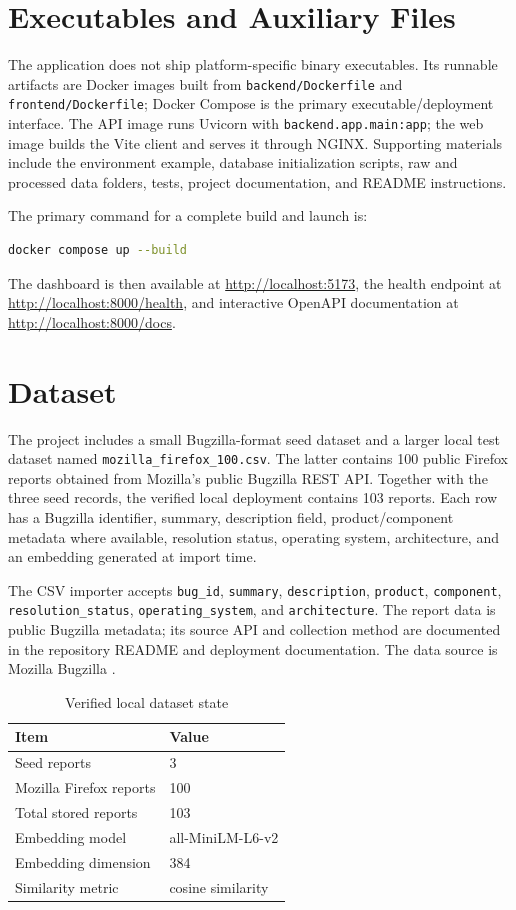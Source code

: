 \documentclass[conference]{IEEEtran}
\begin{document}
\section{Executables and Auxiliary Files}
The application does not ship platform-specific binary executables. Its runnable artifacts are Docker images built from \texttt{backend/Dockerfile} and \texttt{frontend/Dockerfile}; Docker Compose is the primary executable/deployment interface. The API image runs Uvicorn with \texttt{backend.app.main:app}; the web image builds the Vite client and serves it through NGINX. Supporting materials include the environment example, database initialization scripts, raw and processed data folders, tests, project documentation, and README instructions.

The primary command for a complete build and launch is:
\begin{lstlisting}[language=bash]
docker compose up --build
\end{lstlisting}
The dashboard is then available at \url{http://localhost:5173}, the health endpoint at \url{http://localhost:8000/health}, and interactive OpenAPI documentation at \url{http://localhost:8000/docs}.

\section{Dataset}
The project includes a small Bugzilla-format seed dataset and a larger local test dataset named \texttt{mozilla\_firefox\_100.csv}. The latter contains 100 public Firefox reports obtained from Mozilla's public Bugzilla REST API. Together with the three seed records, the verified local deployment contains 103 reports. Each row has a Bugzilla identifier, summary, description field, product/component metadata where available, resolution status, operating system, architecture, and an embedding generated at import time.

The CSV importer accepts \texttt{bug\_id}, \texttt{summary}, \texttt{description}, \texttt{product}, \texttt{component}, \texttt{resolution\_status}, \texttt{operating\_system}, and \texttt{architecture}. The report data is public Bugzilla metadata; its source API and collection method are documented in the repository README and deployment documentation. The data source is Mozilla Bugzilla \cite{mozillaapi}.

\begin{table}[!t]
\caption{Verified local dataset state}
\label{tab:data}
\centering
\begin{tabular}{ll}
\toprule
\textbf{Item} & \textbf{Value}\\
\midrule
Seed reports & 3\\
Mozilla Firefox reports & 100\\
Total stored reports & 103\\
Embedding model & all-MiniLM-L6-v2\\
Embedding dimension & 384\\
Similarity metric & cosine similarity\\
\bottomrule
\end{tabular}
\end{table}
\end{document}

